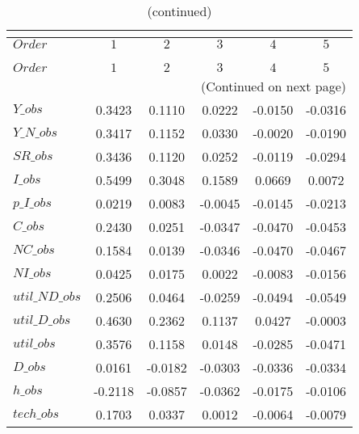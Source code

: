  
\begin{center}
\begin{longtable}{lccccc} 
\caption{COEFFICIENTS OF AUTOCORRELATION}\\
 \label{Table:th_autocorr_matrix}\\
\toprule 
$Order          $	 & 	 $          1$	 & 	 $          2$	 & 	 $          3$	 & 	 $          4$	 & 	 $          5$\\
\midrule \endfirsthead 
\caption{(continued)}\\
 \toprule \\ 
$Order          $	 & 	 $          1$	 & 	 $          2$	 & 	 $          3$	 & 	 $          4$	 & 	 $          5$\\
\midrule \endhead 
\midrule \multicolumn{6}{r}{(Continued on next page)} \\ \bottomrule \endfoot 
\bottomrule \endlastfoot 
$Y\_obs         $	 & 	     0.3423	 & 	     0.1110	 & 	     0.0222	 & 	    -0.0150	 & 	    -0.0316 \\ 
$Y\_N\_obs      $	 & 	     0.3417	 & 	     0.1152	 & 	     0.0330	 & 	    -0.0020	 & 	    -0.0190 \\ 
$SR\_obs        $	 & 	     0.3436	 & 	     0.1120	 & 	     0.0252	 & 	    -0.0119	 & 	    -0.0294 \\ 
$I\_obs         $	 & 	     0.5499	 & 	     0.3048	 & 	     0.1589	 & 	     0.0669	 & 	     0.0072 \\ 
$p\_I\_obs      $	 & 	     0.0219	 & 	     0.0083	 & 	    -0.0045	 & 	    -0.0145	 & 	    -0.0213 \\ 
$C\_obs         $	 & 	     0.2430	 & 	     0.0251	 & 	    -0.0347	 & 	    -0.0470	 & 	    -0.0453 \\ 
$NC\_obs        $	 & 	     0.1584	 & 	     0.0139	 & 	    -0.0346	 & 	    -0.0470	 & 	    -0.0467 \\ 
$NI\_obs        $	 & 	     0.0425	 & 	     0.0175	 & 	     0.0022	 & 	    -0.0083	 & 	    -0.0156 \\ 
$util\_ND\_obs  $	 & 	     0.2506	 & 	     0.0464	 & 	    -0.0259	 & 	    -0.0494	 & 	    -0.0549 \\ 
$util\_D\_obs   $	 & 	     0.4630	 & 	     0.2362	 & 	     0.1137	 & 	     0.0427	 & 	    -0.0003 \\ 
$util\_obs      $	 & 	     0.3576	 & 	     0.1158	 & 	     0.0148	 & 	    -0.0285	 & 	    -0.0471 \\ 
$D\_obs         $	 & 	     0.0161	 & 	    -0.0182	 & 	    -0.0303	 & 	    -0.0336	 & 	    -0.0334 \\ 
$h\_obs         $	 & 	    -0.2118	 & 	    -0.0857	 & 	    -0.0362	 & 	    -0.0175	 & 	    -0.0106 \\ 
$tech\_obs      $	 & 	     0.1703	 & 	     0.0337	 & 	     0.0012	 & 	    -0.0064	 & 	    -0.0079 \\ 
\end{longtable}
 \end{center}
